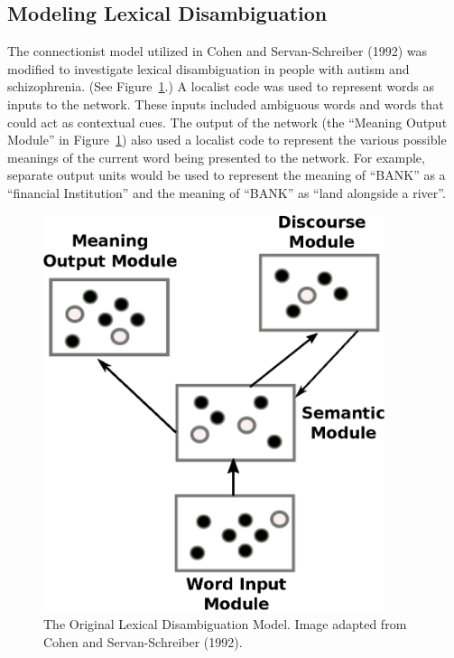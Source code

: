 \subsection{Modeling Lexical Disambiguation}
The connectionist model utilized in Cohen and Servan-Schreiber (1992) was modified to investigate lexical disambiguation in people with autism and schizophrenia. (See Figure~\ref{cohen-servan-schreiber-model}.)  A localist code was used to represent words as inputs to the network. These inputs included ambiguous words and words that could act as contextual cues. The output of the network (the ``Meaning Output Module'' in Figure~\ref{cohen-servan-schreiber-model}) also used a localist code to represent the various possible meanings of the current word being presented to the network. For example, separate output units would be used to represent the meaning of ``BANK'' as a ``financial Institution'' and the meaning of ``BANK'' as ``land alongside a river''.

\begin{figure}[tp]
\begin{center}
	\includegraphics[width=100mm]{figures/Cohen_ServanSchreiber_Model.eps}
\end{center}
\caption{The Original Lexical Disambiguation Model. Image adapted from Cohen and Servan-Schreiber (1992).}
\label{cohen-servan-schreiber-model}
\end{figure} 


